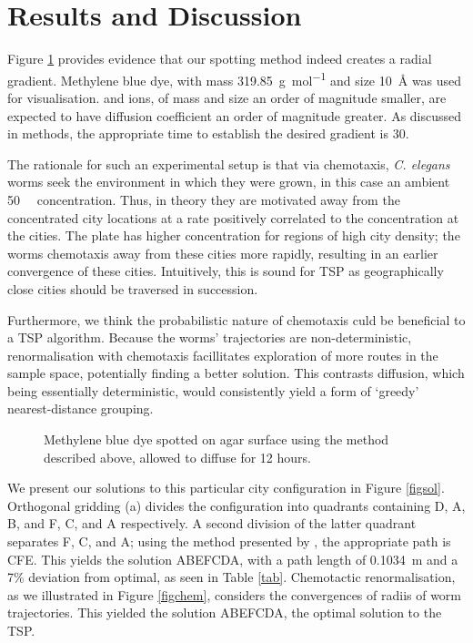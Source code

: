 \documentclass[10pt]{article}
\begin{document}
\section{Results and Discussion}

Figure \ref{figdye} provides evidence that our spotting method indeed creates a radial gradient. Methylene blue dye, with mass \SI{319.85}{\gram\per\mol} and size \SI{10}{\angstrom} was used for visualisation.  and  ions, of mass and size an order of magnitude smaller, are expected to have diffusion coefficient an order of magnitude greater. As discussed in methods, the appropriate time to establish the desired gradient is \SI{30}{\min}.

The rationale for such an experimental setup is that via chemotaxis, \textit{C. elegans} worms seek the environment in which they were grown, in this case an ambient \SI{50}{\milli \molar}  concentration. Thus, in theory they are motivated away from the concentrated  city locations at a rate positively correlated to the concentration at the cities. The plate has higher  concentration for regions of high city density; the worms chemotaxis away from these cities more rapidly, resulting in an earlier convergence of these cities. Intuitively, this is sound for TSP as geographically close cities should be traversed in succession.

Furthermore, we think the probabilistic nature of chemotaxis culd be beneficial to a TSP algorithm. Because the worms' trajectories are non-deterministic, renormalisation with chemotaxis facillitates exploration of more routes in the sample space, potentially finding a better solution. This contrasts diffusion, which being essentially deterministic, would consistently yield a form of `greedy' nearest-distance grouping. 

\begin{figure}[H]
	\centering
	\caption{Methylene blue dye spotted on agar surface using the method described above, allowed to diffuse 
          for 12 hours.}
	\label{figdye}
\end{figure}

We present our solutions to this particular city configuration in Figure \ref{figsol}. Orthogonal gridding (a) divides the configuration into quadrants containing D, A, B, and F, C, and A respectively. A second division of the latter quadrant separates F, C, and A; using the method presented by \citet{Yoshiyuki1995}, the appropriate path is CFE. This yields the solution ABEFCDA, with a path length of \SI{0.1034}{\metre} and a 7\% deviation from optimal, as seen in Table \ref{tab}. Chemotactic renormalisation, as we illustrated in Figure \ref{figchem}, considers the convergences of radiis of worm trajectories. This yielded the solution ABEFCDA, the optimal solution to the TSP.
\end{document}
